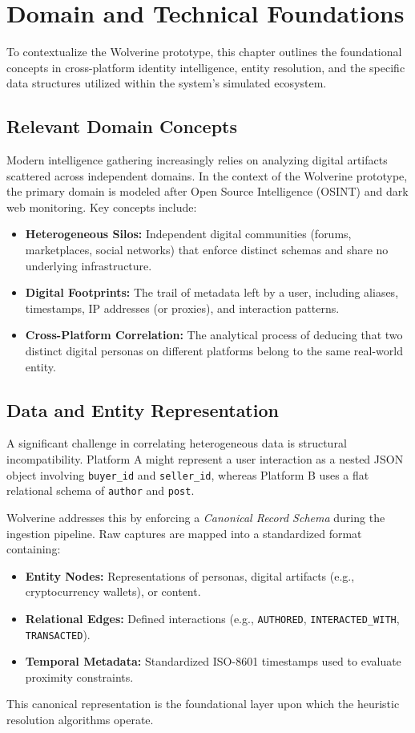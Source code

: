 \chapter{Domain and Technical Foundations}
\label{ch:foundations}

To contextualize the Wolverine prototype, this chapter outlines the foundational concepts in cross-platform identity intelligence, entity resolution, and the specific data structures utilized within the system's simulated ecosystem.

\section{Relevant Domain Concepts}
\label{sec:foundations-domain}
Modern intelligence gathering increasingly relies on analyzing digital artifacts scattered across independent domains. In the context of the Wolverine prototype, the primary domain is modeled after Open Source Intelligence (OSINT) and dark web monitoring. 
Key concepts include:
\begin{itemize}
    \item \textbf{Heterogeneous Silos:} Independent digital communities (forums, marketplaces, social networks) that enforce distinct schemas and share no underlying infrastructure.
    \item \textbf{Digital Footprints:} The trail of metadata left by a user, including aliases, timestamps, IP addresses (or proxies), and interaction patterns.
    \item \textbf{Cross-Platform Correlation:} The analytical process of deducing that two distinct digital personas on different platforms belong to the same real-world entity.
\end{itemize}

\section{Data and Entity Representation}
\label{sec:foundations-data-rep}
A significant challenge in correlating heterogeneous data is structural incompatibility. Platform A might represent a user interaction as a nested JSON object involving \texttt{buyer\_id} and \texttt{seller\_id}, whereas Platform B uses a flat relational schema of \texttt{author} and \texttt{post}.

Wolverine addresses this by enforcing a \textit{Canonical Record Schema} during the ingestion pipeline. Raw captures are mapped into a standardized format containing:
\begin{itemize}
    \item \textbf{Entity Nodes:} Representations of personas, digital artifacts (e.g., cryptocurrency wallets), or content.
    \item \textbf{Relational Edges:} Defined interactions (e.g., \texttt{AUTHORED}, \texttt{INTERACTED\_WITH}, \texttt{TRANSACTED}).
    \item \textbf{Temporal Metadata:} Standardized ISO-8601 timestamps used to evaluate proximity constraints.
\end{itemize}
This canonical representation is the foundational layer upon which the heuristic resolution algorithms operate.

